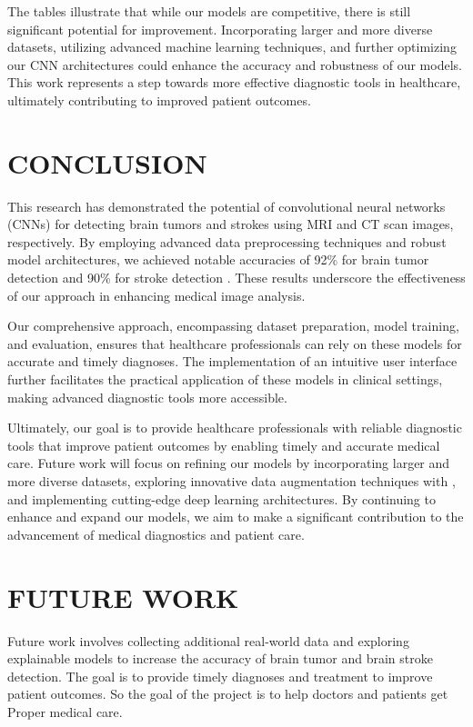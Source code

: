 \documentclass[conference]{IEEEtran}
\begin{document}
The tables illustrate that while our models are competitive, there is still significant potential for improvement. 
Incorporating larger and more diverse datasets, utilizing advanced machine learning techniques, and further optimizing our CNN architectures could enhance the accuracy and robustness of our models. 
This work represents a step towards more effective diagnostic tools in healthcare, ultimately contributing to improved patient outcomes.



\section{CONCLUSION}

This research has demonstrated the potential of convolutional neural networks (CNNs) for detecting brain tumors and strokes using MRI and CT scan images, respectively. 
By employing advanced data preprocessing techniques and robust model architectures, we achieved notable accuracies of 92\% for brain tumor detection \cite{br35h} and 90\% for stroke detection \cite{bioengineering9120783}. 
These results underscore the effectiveness of our approach in enhancing medical image analysis.

Our comprehensive approach, encompassing dataset preparation, model training, and evaluation, ensures that healthcare professionals can rely on these models for accurate and timely diagnoses. 
The implementation of an intuitive user interface further facilitates the practical application of these models in clinical settings, making advanced diagnostic tools more accessible.

Ultimately, our goal is to provide healthcare professionals with reliable diagnostic tools that improve patient outcomes by enabling timely and accurate medical care. 
Future work will focus on refining our models by incorporating larger and more diverse datasets, exploring innovative data augmentation techniques with \cite{huggingface_data}, 
and implementing cutting-edge deep learning architectures. By continuing to enhance and expand our models, we aim to make a significant contribution to the advancement of medical diagnostics and patient care.

\section{FUTURE WORK}

Future work involves collecting additional real-world data and exploring explainable models to increase the accuracy of brain tumor and brain stroke detection. 
The goal is to provide timely diagnoses and treatment to improve patient outcomes.
So the goal of the project is to help doctors and patients get Proper medical care.
\end{document}
